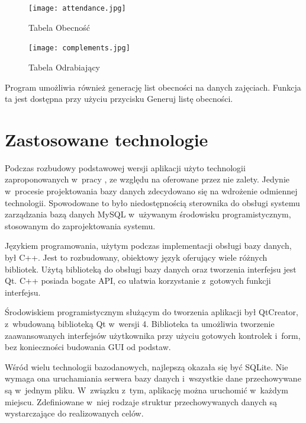 \begin{figure}
\begin{center}
\texttt{[image: attendance.jpg]}
\caption{Tabela Obecność}
\label{fig:attendance}
\end{center}
\end{figure}
\begin{figure}
\begin{center}
\texttt{[image: complements.jpg]}
\caption{Tabela Odrabiający}
\label{fig:complements}
\end{center}
\end{figure}


Program umożliwia również generację list obecności na danych zajęciach. Funkcja ta jest dostępna przy użyciu przycisku Generuj listę obecności.

\section{Zastosowane technologie}
\label{sec:implementacja}

Podczas rozbudowy podstawowej wersji aplikacji użyto technologii zaproponowanych w~pracy \cite{Gl11}, ze względu na oferowane przez nie zalety. Jedynie w~procesie projektowania bazy danych zdecydowano się na wdrożenie odmiennej technologii. Spowodowane to było niedostępnością sterownika do obsługi systemu zarządzania bazą danych MySQL w~używanym środowisku programistycznym, stosowanym do zaprojektowania systemu.

Językiem programowania, użytym podczas implementacji obsługi bazy danych, był C++. Jest to rozbudowany, obiektowy język oferujący wiele różnych bibliotek. Użytą biblioteką do obsługi bazy danych oraz tworzenia interfejsu jest Qt. C++ posiada bogate API, co ułatwia korzystanie z~gotowych funkcji interfejsu.

Środowiskiem programistycznym służącym do tworzenia aplikacji był QtCreator, z~wbudowaną biblioteką Qt w~wersji 4. Biblioteka ta umożliwia tworzenie zaawansowanych interfejsów użytkownika przy użyciu gotowych kontrolek i~form, bez konieczności budowania GUI od podstaw.

Wśród wielu technologii bazodanowych, najlepszą okazała się być SQLite. Nie wymaga ona uruchamiania serwera bazy danych i~wszystkie dane przechowywane są w~jednym pliku. W~związku z~tym, aplikację można uruchomić w~każdym miejscu. Zdefiniowane w~niej rodzaje struktur przechowywanych danych są wystarczające do realizowanych celów.
